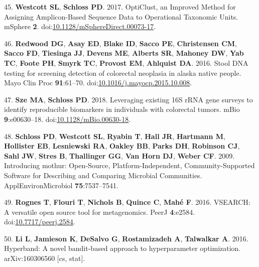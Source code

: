 \documentclass[
  11pt,
]{article}
\begin{document}
\leavevmode\hypertarget{ref-westcott_opticlust_2017}{}%
45. \textbf{Westcott SL}, \textbf{Schloss PD}. 2017. OptiClust, an
Improved Method for Assigning Amplicon-Based Sequence Data to
Operational Taxonomic Units. mSphere \textbf{2}.
doi:\href{https://doi.org/10.1128/mSphereDirect.00073-17}{10.1128/mSphereDirect.00073-17}.

\leavevmode\hypertarget{ref-redwood_stool_2016}{}%
46. \textbf{Redwood DG}, \textbf{Asay ED}, \textbf{Blake ID},
\textbf{Sacco PE}, \textbf{Christensen CM}, \textbf{Sacco FD},
\textbf{Tiesinga JJ}, \textbf{Devens ME}, \textbf{Alberts SR},
\textbf{Mahoney DW}, \textbf{Yab TC}, \textbf{Foote PH}, \textbf{Smyrk
TC}, \textbf{Provost EM}, \textbf{Ahlquist DA}. 2016. Stool DNA testing
for screening detection of colorectal neoplasia in alaska native people.
Mayo Clin Proc \textbf{91}:61--70.
doi:\href{https://doi.org/10.1016/j.mayocp.2015.10.008}{10.1016/j.mayocp.2015.10.008}.

\leavevmode\hypertarget{ref-sze_leveraging_2018}{}%
47. \textbf{Sze MA}, \textbf{Schloss PD}. 2018. Leveraging existing 16S
rRNA gene surveys to identify reproducible biomarkers in individuals
with colorectal tumors. mBio \textbf{9}:e00630--18.
doi:\href{https://doi.org/10.1128/mBio.00630-18}{10.1128/mBio.00630-18}.

\leavevmode\hypertarget{ref-schloss_introducing_2009}{}%
48. \textbf{Schloss PD}, \textbf{Westcott SL}, \textbf{Ryabin T},
\textbf{Hall JR}, \textbf{Hartmann M}, \textbf{Hollister EB},
\textbf{Lesniewski RA}, \textbf{Oakley BB}, \textbf{Parks DH},
\textbf{Robinson CJ}, \textbf{Sahl JW}, \textbf{Stres B},
\textbf{Thallinger GG}, \textbf{Van Horn DJ}, \textbf{Weber CF}. 2009.
Introducing mothur: Open-Source, Platform-Independent,
Community-Supported Software for Describing and Comparing Microbial
Communities. ApplEnvironMicrobiol \textbf{75}:7537--7541.

\leavevmode\hypertarget{ref-rognes_vsearch_2016}{}%
49. \textbf{Rognes T}, \textbf{Flouri T}, \textbf{Nichols B},
\textbf{Quince C}, \textbf{Mahé F}. 2016. VSEARCH: A versatile open
source tool for metagenomics. PeerJ \textbf{4}:e2584.
doi:\href{https://doi.org/10.7717/peerj.2584}{10.7717/peerj.2584}.

\leavevmode\hypertarget{ref-li_hyperband:_2016}{}%
50. \textbf{Li L}, \textbf{Jamieson K}, \textbf{DeSalvo G},
\textbf{Rostamizadeh A}, \textbf{Talwalkar A}. 2016. Hyperband: A novel
bandit-based approach to hyperparameter optimization. arXiv:160306560
{[}cs, stat{]}.

\newpage
\end{document}
